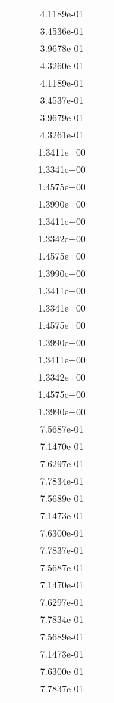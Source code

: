 \begin{xltabular}{\textwidth}{r|rS[table-format=1.3e+2]S[table-format=1.4e+2]S[table-format=1.4e+2]S[table-format=-1.5]}
&  &  & 4.1189e-01 & & \\
&  &  & 3.4536e-01 & & \\
&  &  & 3.9678e-01 & & \\
&  &  & 4.3260e-01 & & \\
&  &  & 4.1189e-01 & & \\
&  &  & 3.4537e-01 & & \\
&  &  & 3.9679e-01 & & \\
&  &  & 4.3261e-01 & & \\
&  &  & 1.3411e+00 & & \\
&  &  & 1.3341e+00 & & \\
&  &  & 1.4575e+00 & & \\
&  &  & 1.3990e+00 & & \\
&  &  & 1.3411e+00 & & \\
&  &  & 1.3342e+00 & & \\
&  &  & 1.4575e+00 & & \\
&  &  & 1.3990e+00 & & \\
&  &  & 1.3411e+00 & & \\
&  &  & 1.3341e+00 & & \\
&  &  & 1.4575e+00 & & \\
&  &  & 1.3990e+00 & & \\
&  &  & 1.3411e+00 & & \\
&  &  & 1.3342e+00 & & \\
&  &  & 1.4575e+00 & & \\
&  &  & 1.3990e+00 & & \\
&  &  & 7.5687e-01 & & \\
&  &  & 7.1470e-01 & & \\
&  &  & 7.6297e-01 & & \\
&  &  & 7.7834e-01 & & \\
&  &  & 7.5689e-01 & & \\
&  &  & 7.1473e-01 & & \\
&  &  & 7.6300e-01 & & \\
&  &  & 7.7837e-01 & & \\
&  &  & 7.5687e-01 & & \\
&  &  & 7.1470e-01 & & \\
&  &  & 7.6297e-01 & & \\
&  &  & 7.7834e-01 & & \\
&  &  & 7.5689e-01 & & \\
&  &  & 7.1473e-01 & & \\
&  &  & 7.6300e-01 & & \\
&  &  & 7.7837e-01 & & \\

\end{xltabular}
